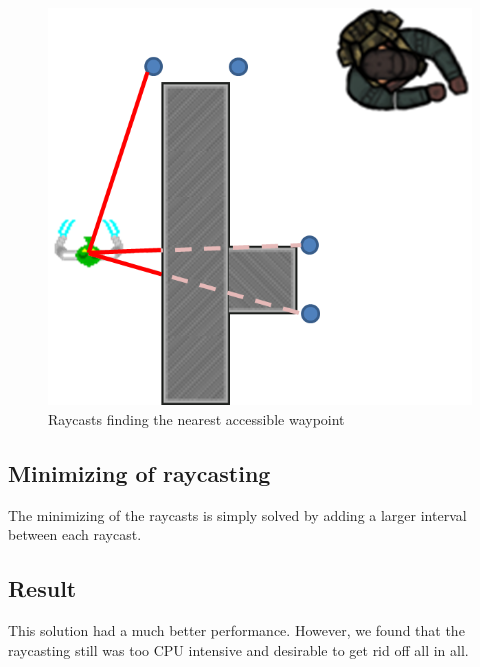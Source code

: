 \begin{figure}[H]
	\includegraphics[width=\textwidth]{figures/astar/findNearestWaypoint}
	\caption{Raycasts finding the nearest accessible waypoint}
	\label{nearestWaypoint}
\end{figure}

\subsection*{Minimizing of raycasting}
The minimizing of the raycasts is simply solved by adding a larger interval between each raycast.

\subsection*{Result}
This solution had a much better performance. However, we found that the raycasting still was too CPU intensive and desirable to get rid off all in all.